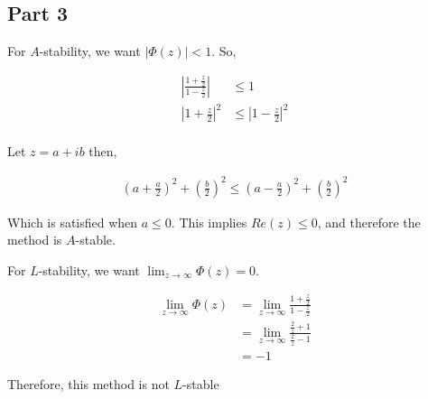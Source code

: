 \documentclass{article}
\begin{document}
\subsection{Part 3}%
\label{sub:part_3}

\par For $A$-stability, we want $|\Phi (z)| < 1$.  So, 

\begin{align*}
  \left|\frac{ 1 + \frac{z}{2} }{1 - \frac{z}{2}}\right| &\leq 1\\
  \left|1 + \frac{z}{2}\right|^{2} &\leq \left|1 - \frac{z}{2} \right|^{2} \\
\end{align*}

\par Let $z = a+ib$ then,

\begin{align*}
  \left(a + \frac{a}{2}\right)^{2} + \left( \frac{b}{2}\right)^{2} \leq \left(
  a- \frac{a}{2}\right)^{2} + \left(\frac{b}{2}\right)^{2}
\end{align*}

Which is satisfied when $a \leq 0$. This implies  $Re(z) \leq 0$, and therefore
the method is  $A$-stable.

\vspace{15px}
For $L$-stability, we want $ \lim_{z \to \infty} \Phi (z) = 0 $.

\begin{align*}
  \lim_{z \to \infty} \Phi (z) &=\lim_{z \to \infty} \frac{ 1 + \frac{z}{2} }{1
  - \frac{z}{2}}\\
                               &= \lim_{z \to \infty} \frac{ \frac{2}{z} + 1 }{
                               \frac{2}{z} - 1} \\
                               &= -1
\end{align*}

Therefore, this method is not $L$-stable
\end{document}
